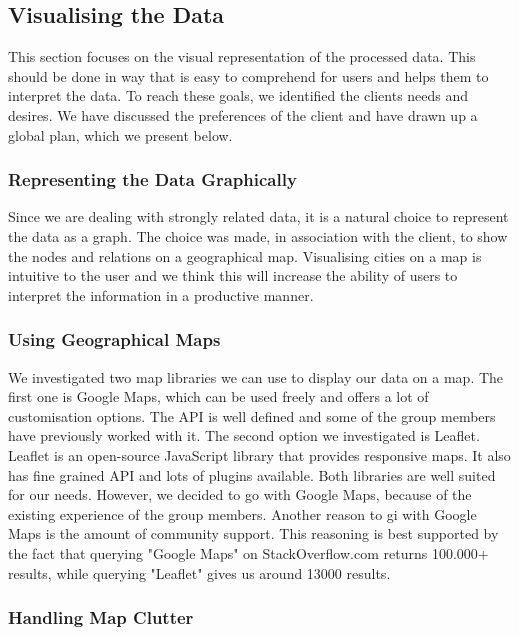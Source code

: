 \subsection{Visualising the Data}

This section focuses on the visual representation of the processed data. This should be done in way that is easy to comprehend for users and helps them to interpret the data. To reach these goals, we identified the clients needs and desires. We have discussed the preferences of the client and have drawn up a global plan, which we present below.

\subsubsection{Representing the Data Graphically}

Since we are dealing with strongly related data, it is a natural choice to represent the data as a graph. The choice was made, in association with the client, to show the nodes and relations on a geographical map. Visualising cities on a map is intuitive to the user and we think this will increase the ability of users to interpret the information in a productive manner.

\subsubsection{Using Geographical Maps}

We investigated two map libraries we can use to display our data on a map. The first one is Google Maps, which can be used freely and offers a lot of customisation options. The API is well defined and some of the group members have previously worked with it. The second option we investigated is Leaflet. Leaflet is an open-source JavaScript library that provides responsive maps. It also has fine grained API and lots of plugins available.
Both libraries are well suited for our needs. However, we decided to go with Google Maps, because of the existing experience of the group members. Another reason to gi with Google Maps is the amount of community support. This reasoning is best supported by the fact that querying "Google Maps" on StackOverflow.com returns 100.000+ results, while querying "Leaflet" gives us around 13000 results.

\subsubsection{Handling Map Clutter}

